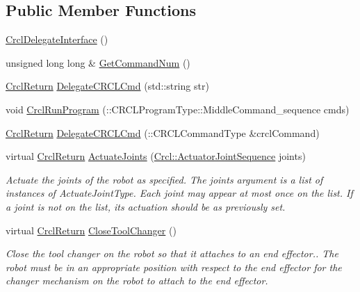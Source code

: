 \subsection*{Public Member Functions}
\begin{DoxyCompactItemize}
\item 
\hyperlink{classCrcl_1_1CrclDelegateInterface_ab6dab41e2398ed9a2cd2ac58e4c00ea2}{Crcl\-Delegate\-Interface} ()
\item 
unsigned long long \& \hyperlink{classCrcl_1_1CrclDelegateInterface_a352a54f3e006b3daecdf5d37ff6ca4bc}{Get\-Command\-Num} ()
\item 
\hyperlink{namespaceCrcl_a1ed3b29723118a020251dde9b12733c0}{Crcl\-Return} \hyperlink{classCrcl_1_1CrclDelegateInterface_a53be7c01e92e61e2be19e535e307ba41}{Delegate\-C\-R\-C\-L\-Cmd} (std\-::string str)
\item 
void \hyperlink{classCrcl_1_1CrclDelegateInterface_a0c0209dd04c5e99e13c546b99a672ce4}{Crcl\-Run\-Program} (\-::C\-R\-C\-L\-Program\-Type\-::\-Middle\-Command\-\_\-sequence cmds)
\item 
\hyperlink{namespaceCrcl_a1ed3b29723118a020251dde9b12733c0}{Crcl\-Return} \hyperlink{classCrcl_1_1CrclDelegateInterface_a7513484f2c0d14332f844bdbae2c0586}{Delegate\-C\-R\-C\-L\-Cmd} (\-::C\-R\-C\-L\-Command\-Type \&crcl\-Command)
\item 
virtual \hyperlink{namespaceCrcl_a1ed3b29723118a020251dde9b12733c0}{Crcl\-Return} \hyperlink{classCrcl_1_1CrclDelegateInterface_a5e666cfdbbaee53ddead4035cda12399}{Actuate\-Joints} (\hyperlink{namespaceCrcl_af084766e8e2d38a135cc67ef54d9904d}{Crcl\-::\-Actuator\-Joint\-Sequence} joints)
\begin{DoxyCompactList}\small\item\em Actuate the joints of the robot as specified. The joints argument is a list of instances of Actuate\-Joint\-Type. Each joint may appear at most once on the list. If a joint is not on the list, its actuation should be as previously set. \end{DoxyCompactList}\item 
virtual \hyperlink{namespaceCrcl_a1ed3b29723118a020251dde9b12733c0}{Crcl\-Return} \hyperlink{classCrcl_1_1CrclDelegateInterface_a3c8fc025f6c0eba5609b3e0866810651}{Close\-Tool\-Changer} ()
\begin{DoxyCompactList}\small\item\em Close the tool changer on the robot so that it attaches to an end effector.. The robot must be in an appropriate position with respect to the end effector for the changer mechanism on the robot to attach to the end effector. \end{DoxyCompactList}\item 

\end{DoxyCompactItemize}
